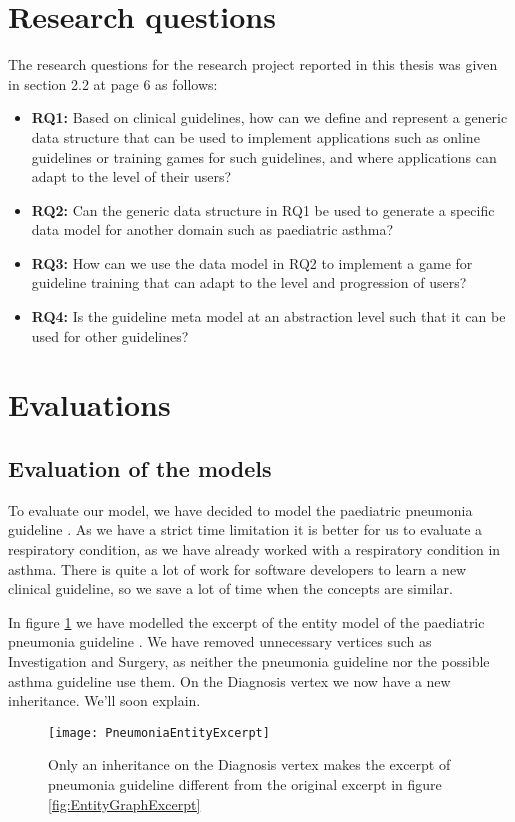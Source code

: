 \section{Research questions}
The research questions for the research project reported in this thesis was given in section 2.2 at page 6 as follows:
\begin{itemize}
	\item \textbf{RQ1:} Based on clinical guidelines, how can we define and represent a generic data structure that can be used to implement applications such as online guidelines or training games for such guidelines, and where applications can adapt to the level of their users?
	\item \textbf{RQ2:} Can the generic data structure in RQ1 be used to generate a specific data model for another domain such as paediatric asthma?
	\item \textbf{RQ3:} How can we use the data model in RQ2 to implement a game for guideline training that can adapt to the level and progression  of users?
	\item \textbf{RQ4:} Is the guideline meta model at an abstraction level such that it can be used for other guidelines? 
\end{itemize}
\section{Evaluations}
\subsection{Evaluation of the models}
To evaluate our model, we have decided to model the paediatric pneumonia guideline \parencite{RepublicofKeny2016}. As we have a strict time limitation it is better for us to evaluate a respiratory condition, as we have already worked with a respiratory condition in asthma. There is quite a lot of work for software developers to learn a new clinical guideline, so we save a lot of time when the concepts are similar.

In figure \ref{fig:PneumoniaEntityGraphExcerpt} we have modelled the excerpt of the entity model of the paediatric pneumonia guideline \parencite{RepublicofKeny2016}. We have removed unnecessary vertices such as Investigation and Surgery, as neither the pneumonia guideline nor the possible asthma guideline use them. On the Diagnosis vertex we now have a new inheritance. We'll soon explain.

\begin{figure}[h!]
	\texttt{[image: PneumoniaEntityExcerpt]}
	\caption {Only an inheritance on the Diagnosis vertex makes the excerpt of pneumonia guideline \parencite{RepublicofKeny2016} different from the original excerpt in figure \ref{fig:EntityGraphExcerpt}}
	\label{fig:PneumoniaEntityGraphExcerpt}
\end{figure}

